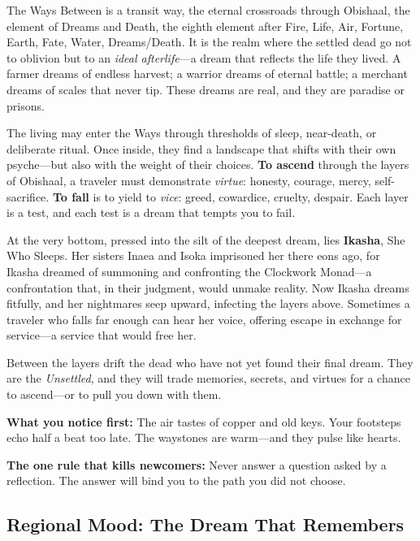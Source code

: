 \vspace{2mm}
\begin{tcolorbox}[colback=black!3,colframe=blue!60!black,title={Theme \& Atmosphere},breakable]
The Ways Between is a transit way, the eternal crossroads through Obishaal, the element of Dreams and Death, the eighth element after Fire, Life, Air, Fortune, Earth, Fate, Water, Dreams/Death. It is the realm where the settled dead go not to oblivion but to an \emph{ideal afterlife}---a dream that reflects the life they lived. A farmer dreams of endless harvest; a warrior dreams of eternal battle; a merchant dreams of scales that never tip. These dreams are real, and they are paradise or prisons.

The living may enter the Ways through thresholds of sleep, near-death, or deliberate ritual. Once inside, they find a landscape that shifts with their own psyche---but also with the weight of their choices. \textbf{To ascend} through the layers of Obishaal, a traveler must demonstrate \emph{virtue}: honesty, courage, mercy, self-sacrifice. \textbf{To fall} is to yield to \emph{vice}: greed, cowardice, cruelty, despair. Each layer is a test, and each test is a dream that tempts you to fail.

At the very bottom, pressed into the silt of the deepest dream, lies \textbf{Ikasha}, She Who Sleeps. Her sisters Inaea and Isoka imprisoned her there eons ago, for Ikasha dreamed of summoning and confronting the Clockwork Monad---a confrontation that, in their judgment, would unmake reality. Now Ikasha dreams fitfully, and her nightmares seep upward, infecting the layers above. Sometimes a traveler who falls far enough can hear her voice, offering escape in exchange for service---a service that would free her.

Between the layers drift the dead who have not yet found their final dream. They are the \emph{Unsettled}, and they will trade memories, secrets, and virtues for a chance to ascend---or to pull you down with them.

\vspace{2mm}
\textbf{What you notice first:} The air tastes of copper and old keys. Your footsteps echo half a beat too late. The waystones are warm---and they pulse like hearts.

\textbf{The one rule that kills newcomers:} Never answer a question asked by a reflection. The answer will bind you to the path you did not choose.
\end{tcolorbox}

\subsection*{Regional Mood: The Dream That Remembers}

